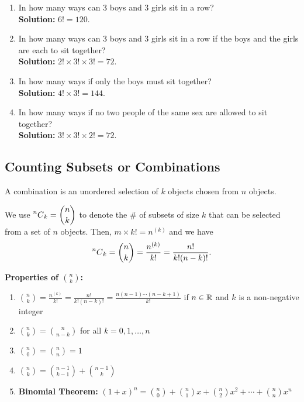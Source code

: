 \begin{example}
    \phantom{}
    \begin{enumerate}[label={(\alph*)}]
        \item In how many ways can 3 boys and 3 girls sit in a row? \\
        \textbf{Solution: } $6! = 120$.
        \item In how many ways can 3 boys and 3 girls sit in a row if the boys and the girls are each to sit together? \\
        \textbf{Solution: } $2! \times 3! \times 3! = 72$.
        \item In how many ways if only the boys must sit together? \\
        \textbf{Solution: } $4! \times 3! = 144$.
        \item In how many ways if no two people of the same sex are allowed to sit together? \\
        \textbf{Solution: } $3! \times 3! \times 2! = 72$.
    \end{enumerate}
    
\end{example}


\subsection{Counting Subsets or Combinations}

\begin{definition}[Combination]
    A combination is an unordered selection of $k$ objects chosen from $n$ objects.
\end{definition}

\begin{remark}
    We use $\displaystyle \prescript{n}{}{C}_{k} = \binom{n}{k}$ to
    denote the \# of subsets of size $k$ that can be selected from a set of $n$ objects.
    Then, $m \times k! = n^{(k)}$ and we have
    \[\prescript{n}{}{C}_{k} = \binom{n}{k} = \frac{n^{(k)}}{k!} = \frac{n!}{k!(n-k)!}.\]
\end{remark}

\textbf{Properties of $\binom{n}{k}$: }
\begin{enumerate}
    \item $\binom{n}{k} = \frac{n^{(k)}}{k!} = \frac{n!}{k!(n-k)!} = \frac{n(n-1)\cdots(n-k+1)}{k!}$ if $n \in {\mathbb{R}}$ and $k$ is a non-negative integer
    \item $\binom{n}{k} = \binom{n}{n-k}$ for all $k = 0, 1, \ldots, n$
    \item $\binom{n}{0} = \binom{n}{n} = 1$
    \item $\binom{n}{k} = \binom{n-1}{k-1} + \binom{n-1}{k}$
    \item \textbf{Binomial Theorem: } $(1 + x)^n = \binom{n}{0} + \binom{n}{1}x + \binom{n}{2}x^2 + \cdots + \binom{n}{n}x^n$
\end{enumerate}


